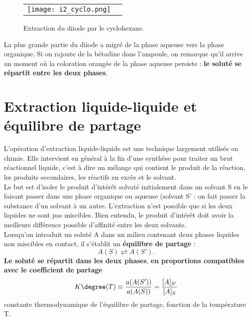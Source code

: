 \documentclass[11pt,a4paper]{report}
\begin{document}
\begin{figure}[h!]
\begin{center}
	\begin{tabular}{cc}
		\texttt{[image: i2\_cyclo.png]}
	\end{tabular}
\end{center}
\caption{Extraction du diiode par le cyclohexane.}
\end{figure}	
	
La plus grande partie du diiode a migré de la phase aqueuse vers la phase organique. Si on rajoute de la bétadine dans l'ampoule, on remarque qu'il arrive un moment où la coloration orangée de la phase aqueuse persiste : \textbf{le soluté se répartit entre les deux phases}.	
	
\section{Extraction liquide-liquide et équilibre de partage}\label{sec:3}

L'opération d'extraction liquide-liquide est une technique largement utilisée en chimie.
Elle intervient en général à la fin d'une synthèse pour traiter un brut réactionnel liquide,
c'est à dire un mélange qui contient le produit de la réaction, les produits secondaires, les réactifs en excès et le solvant.\\

Le but est d'isoler le produit d'intérêt solvaté initialement dans un solvant S en le faisant passer dans une phase organique ou aqueuse (solvant S' : on fait passer la substance d'un solvant à un autre. L'extraction n'est possible que si les deux liquides ne sont pas miscibles. Bien entendu, le produit d'intérêt doit avoir la meilleure différence possible d'affinité entre les deux solvants.\\

Lorsqu'on introduit un soluté A dans un milieu contenant deux phases liquides non miscibles en contact, il s'établit un \textbf{équilibre de partage} : 
\begin{equation}
	\boxed{A(S) \rightleftarrows A(S')}.
\end{equation}
\textbf{Le soluté se répartit dans les deux phases}, \textbf{en proportions compatibles avec le coefficient de partage}
\begin{equation}
	{K\degree}(T) \equiv \frac{a(A(S'))}{a(A(S))} = \frac{[A]_{S'}}{[A]_S}
\end{equation}
constante thermodynamique de l'équilibre de partage, fonction de la température T.
\end{document}
